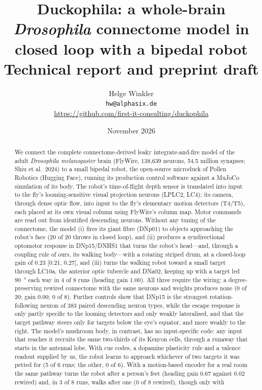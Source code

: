 \documentclass[10pt,a4paper]{article}
\title{\textbf{Duckophila: a whole-brain \emph{Drosophila} connectome model in closed loop with a bipedal robot}\\[0.4em]
\large Technical report and preprint draft}
\author{Helge Winkler\\\small\texttt{hw@alphasix.de}\\\small\url{https://github.com/first-it-consulting/duckophila}}
\date{November 2026}
\begin{document}
\maketitle

\begin{abstract}
We connect the complete connectome-derived leaky integrate-and-fire model of the adult \emph{Drosophila
melanogaster} brain (FlyWire, 138{,}639 neurons, 54.5 million synapses; Shiu et al.\ 2024) to a small
bipedal robot, the open-source microduck of Pollen Robotics (Hugging Face), running its production control software against a MuJoCo
simulation of its body. The robot's time-of-flight depth sensor is translated into input to the fly's
looming-sensitive visual projection neurons (LPLC2, LC4); its camera, through dense optic flow, into input
to the fly's elementary motion detectors (T4/T5), each placed at its own visual column using FlyWire's
column map. Motor commands are read out from identified descending neurons. Without any tuning of the
connectome, the model (i) fires its giant fibre (DNp01) to objects approaching the robot's face (20 of
20 throws in closed loop), and (ii) produces a syndirectional optomotor response in DNp15/DNHS1 that turns
the robot's head---and, through a coupling rule of ours, its walking body---with a rotating striped drum,
at a closed-loop gain of 0.23 [0.21, 0.27], and (iii) turns the walking robot toward a small target
through LC10a, the anterior optic tubercle and DNa02, keeping up with a target led \SI{90}{\degree} each
way in 4 of 8 runs (heading gain 1.00). All three require the wiring: a degree-preserving rewired
connectome with the same neurons and weights produces none (0 of 20; gain 0.00; 0 of 8). Further controls show
that DNp15 is the strongest rotation-following neuron of 383 paired descending neuron types, while the
escape response is only partly specific to the looming detectors and only weakly lateralised, and that
the target pathway steers only for targets below the eye's equator, and more weakly to the right.
The model's mushroom body, in contrast, has no input-specific code: any input that reaches it recruits
the same two-thirds of its Kenyon cells, through a runaway that starts in the antennal lobe. With
cue codes, a dopamine plasticity rule and a valence readout supplied by us, the robot learns to
approach whichever of two targets it was petted for (5 of 6 runs; the other, 0 of 6). With a
motion-based encoder for a real room the same pathway turns the robot after a person's feet (heading
gain 0.67 against 0.02 rewired) and, in 3 of 8 runs, walks after one (0 of 8 rewired), though only with

\end{abstract}
\end{document}
